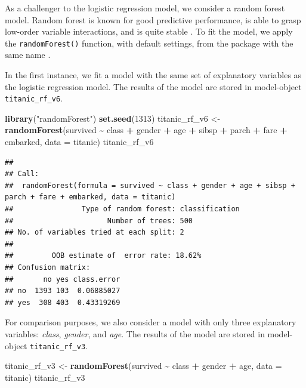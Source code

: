 \documentclass[12pt,]{krantz}
\newenvironment{Shaded}{\begin{snugshade}}{\end{snugshade}}
\newcommand{\DataTypeTok}[1]{\textcolor[rgb]{0.13,0.29,0.53}{#1}}
\newcommand{\DecValTok}[1]{\textcolor[rgb]{0.00,0.00,0.81}{#1}}
\newcommand{\KeywordTok}[1]{\textcolor[rgb]{0.13,0.29,0.53}{\textbf{#1}}}
\newcommand{\NormalTok}[1]{#1}
\newcommand{\OperatorTok}[1]{\textcolor[rgb]{0.81,0.36,0.00}{\textbf{#1}}}
\newcommand{\StringTok}[1]{\textcolor[rgb]{0.31,0.60,0.02}{#1}}
\begin{document}
As a challenger to the logistic regression model, we consider a random forest model. Random forest is known for good predictive performance, is able to grasp low-order variable interactions, and is quite stable \citep{randomForestBreiman}. To fit the model, we apply the \texttt{randomForest()} function, with default settings, from the package with the same name \citep{randomForest}.

In the first instance, we fit a model with the same set of explanatory variables as the logistic regression model. The results of the model are stored in model-object \texttt{titanic\_rf\_v6}.

\begin{Shaded}
\begin{Highlighting}[]
\KeywordTok{library}\NormalTok{(}\StringTok{"randomForest"}\NormalTok{)}
\KeywordTok{set.seed}\NormalTok{(}\DecValTok{1313}\NormalTok{)}
\NormalTok{titanic\_rf\_v6 \textless{}{-}}\StringTok{ }\KeywordTok{randomForest}\NormalTok{(survived }\OperatorTok{\textasciitilde{}}\StringTok{ }\NormalTok{class }\OperatorTok{+}\StringTok{ }\NormalTok{gender }\OperatorTok{+}\StringTok{ }\NormalTok{age }\OperatorTok{+}\StringTok{ }\NormalTok{sibsp }\OperatorTok{+}\StringTok{ }\NormalTok{parch }\OperatorTok{+}\StringTok{ }\NormalTok{fare }\OperatorTok{+}\StringTok{ }\NormalTok{embarked, }
                           \DataTypeTok{data =}\NormalTok{ titanic)}
\NormalTok{titanic\_rf\_v6}
\end{Highlighting}
\end{Shaded}

\begin{verbatim}
## 
## Call:
##  randomForest(formula = survived ~ class + gender + age + sibsp +      parch + fare + embarked, data = titanic) 
##                Type of random forest: classification
##                      Number of trees: 500
## No. of variables tried at each split: 2
## 
##         OOB estimate of  error rate: 18.62%
## Confusion matrix:
##       no yes class.error
## no  1393 103  0.06885027
## yes  308 403  0.43319269
\end{verbatim}

For comparison purposes, we also consider a model with only three explanatory variables: \emph{class}, \emph{gender}, and \emph{age}. The results of the model are stored in model-object \texttt{titanic\_rf\_v3}.

\begin{Shaded}
\begin{Highlighting}[]
\NormalTok{titanic\_rf\_v3 \textless{}{-}}\StringTok{ }\KeywordTok{randomForest}\NormalTok{(survived }\OperatorTok{\textasciitilde{}}\StringTok{ }\NormalTok{class }\OperatorTok{+}\StringTok{ }\NormalTok{gender }\OperatorTok{+}\StringTok{ }\NormalTok{age, }\DataTypeTok{data =}\NormalTok{ titanic)}
\NormalTok{titanic\_rf\_v3}
\end{Highlighting}
\end{Shaded}
\end{document}
